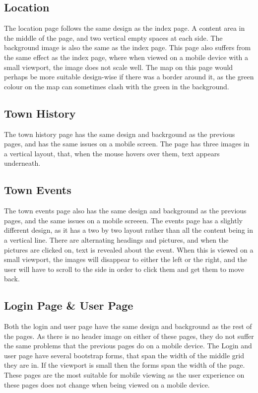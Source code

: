 \documentclass[12pt,a4paper]{article}
\begin{document}
		\subsection{Location}
		The location page follows the same design as the index page. A content area in the middle of the page, and two vertical empty spaces at each side. The background image is also the same as the index page. This page also suffers from the same effect as the index page, where when viewed on a mobile device with a small viewport, the image does not scale well. The map on this page would perhaps be more suitable design-wise if there was a border around it, as the green colour on the map can sometimes clash with the green in the background.

		\subsection{Town History}
		The town history page has the same design and backrgound as the previous pages, and has the same issues on a mobile screen. The page has three images in a vertical layout, that, when the mouse hovers over them, text appears underneath.

		\subsection{Town Events}
		The town events page also has the same design and background as the previous pages, and the same issues on a mobile screeen. The events page has a slightly different design, as it has a two by two layout rather than all the content being in a vertical line. There are alternating headings and pictures, and when the pictures are clicked on, text is revealed about the event. When this is viewed on a small viewport, the images will disappear to either the left or the right, and the user will have to scroll to the side in order to click them and get them to move back.

		\subsection{Login Page & User Page}
		Both the login and user page have the same design and background as the rest of the pages. As there is no header image on either of these pages, they do not suffer the same problems that the previous pages do on a mobile device. The Login and user page have several bootstrap forms, that span the width of the middle grid they are in. If the viewport is small then the forms span the width of the page. These pages are the most suitable for mobile viewing as the user experience on these pages does not change when being viewed on a mobile device.
\end{document}
